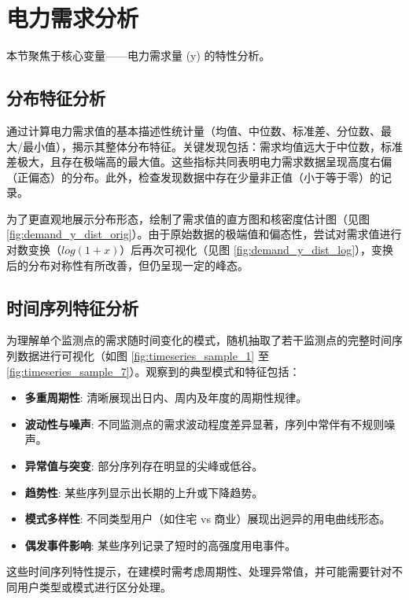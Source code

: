 \documentclass{article} %
\begin{document}
\section{电力需求分析}
\label{sec:demand_analysis}

本节聚焦于核心变量——电力需求量 (y) 的特性分析。

\subsection{分布特征分析}
\label{subsec:demand_distribution}

通过计算电力需求值的基本描述性统计量（均值、中位数、标准差、分位数、最大/最小值），揭示其整体分布特征。关键发现包括：需求均值远大于中位数，标准差极大，且存在极端高的最大值。这些指标共同表明电力需求数据呈现高度右偏（正偏态）的分布。此外，检查发现数据中存在少量非正值（小于等于零）的记录。

为了更直观地展示分布形态，绘制了需求值的直方图和核密度估计图（见图 \ref{fig:demand_y_dist_orig}）。由于原始数据的极端值和偏态性，尝试对需求值进行对数变换（\(log(1+x)\)）后再次可视化（见图 \ref{fig:demand_y_dist_log}），变换后的分布对称性有所改善，但仍呈现一定的峰态。

\subsection{时间序列特征分析}
\label{subsec:demand_timeseries}

为理解单个监测点的需求随时间变化的模式，随机抽取了若干监测点的完整时间序列数据进行可视化（如图 \ref{fig:timeseries_sample_1} 至 \ref{fig:timeseries_sample_7}）。观察到的典型模式和特征包括：
\begin{itemize}
    \item \textbf{多重周期性}: 清晰展现出日内、周内及年度的周期性规律。
    \item \textbf{波动性与噪声}: 不同监测点的需求波动程度差异显著，序列中常伴有不规则噪声。
    \item \textbf{异常值与突变}: 部分序列存在明显的尖峰或低谷。
    \item \textbf{趋势性}: 某些序列显示出长期的上升或下降趋势。
    \item \textbf{模式多样性}: 不同类型用户（如住宅 vs 商业）展现出迥异的用电曲线形态。
    \item \textbf{偶发事件影响}: 某些序列记录了短时的高强度用电事件。
\end{itemize}
这些时间序列特性提示，在建模时需考虑周期性、处理异常值，并可能需要针对不同用户类型或模式进行区分处理。
\end{document}
